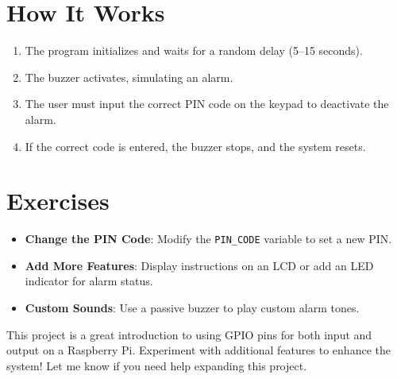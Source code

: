 \documentclass{article}
\begin{document}
	\section*{How It Works}
	\begin{enumerate}
		\item The program initializes and waits for a random delay (5–15 seconds).
		\item The buzzer activates, simulating an alarm.
		\item The user must input the correct PIN code on the keypad to deactivate the alarm.
		\item If the correct code is entered, the buzzer stops, and the system resets.
	\end{enumerate}
	
	\section*{Exercises}
	\begin{itemize}
		\item \textbf{Change the PIN Code}: Modify the \texttt{PIN\_CODE} variable to set a new PIN.
		\item \textbf{Add More Features}: Display instructions on an LCD or add an LED indicator for alarm status.
		\item \textbf{Custom Sounds}: Use a passive buzzer to play custom alarm tones.
	\end{itemize}
	
	This project is a great introduction to using GPIO pins for both input and output on a Raspberry Pi. Experiment with additional features to enhance the system! Let me know if you need help expanding this project.
	
\end{document}
